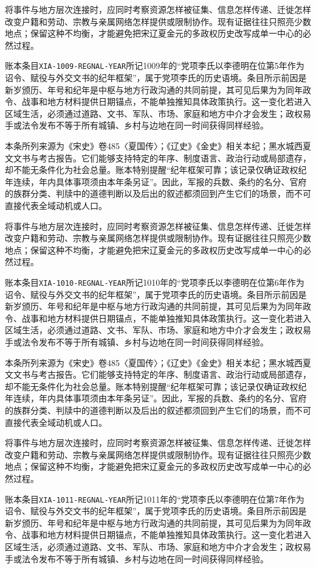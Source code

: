 将事件与地方层次连接时，应同时考察资源怎样被征集、信息怎样传递、迁徙怎样改变户籍和劳动、宗教与亲属网络怎样提供或限制协作。现有证据往往只照亮少数地点；保留这种不均衡，才能避免把宋辽夏金元的多政权历史改写成单一中心的必然过程。

账本条目\texttt{XIA-1009-REGNAL-YEAR}所记1009年的“党项李氏以李德明在位第5年作为诏令、赋役与外交文书的纪年框架”，属于党项李氏的历史语境。条目所示前因是新岁颁历、年号和纪年是中枢与地方行政沟通的共同前提，其可见后果为为同年政令、战事和地方材料提供日期锚点，不能单独推知具体政策执行。这一变化若进入区域生活，必须通过道路、文书、军队、市场、家庭和地方中介才会发生；政权易手或法令发布不等于所有城镇、乡村与边地在同一时间获得同样经验。

本条所列来源为《宋史》卷485〈夏国传〉；《辽史》《金史》相关本纪；黑水城西夏文文书与考古报告。它们能够支持特定的年序、制度语言、政治行动或局部遗存，却不能无条件化为社会总量。账本特别提醒“纪年框架可靠；该记录仅确证政权纪年连续，年内具体事项须由本年条另证”。因此，军报的兵数、条约的名分、官府的族群分类、判牍中的道德判断以及后出的叙述都须回到产生它们的场景，而不可直接代表全域动机或人口。

将事件与地方层次连接时，应同时考察资源怎样被征集、信息怎样传递、迁徙怎样改变户籍和劳动、宗教与亲属网络怎样提供或限制协作。现有证据往往只照亮少数地点；保留这种不均衡，才能避免把宋辽夏金元的多政权历史改写成单一中心的必然过程。

账本条目\texttt{XIA-1010-REGNAL-YEAR}所记1010年的“党项李氏以李德明在位第6年作为诏令、赋役与外交文书的纪年框架”，属于党项李氏的历史语境。条目所示前因是新岁颁历、年号和纪年是中枢与地方行政沟通的共同前提，其可见后果为为同年政令、战事和地方材料提供日期锚点，不能单独推知具体政策执行。这一变化若进入区域生活，必须通过道路、文书、军队、市场、家庭和地方中介才会发生；政权易手或法令发布不等于所有城镇、乡村与边地在同一时间获得同样经验。

本条所列来源为《宋史》卷485〈夏国传〉；《辽史》《金史》相关本纪；黑水城西夏文文书与考古报告。它们能够支持特定的年序、制度语言、政治行动或局部遗存，却不能无条件化为社会总量。账本特别提醒“纪年框架可靠；该记录仅确证政权纪年连续，年内具体事项须由本年条另证”。因此，军报的兵数、条约的名分、官府的族群分类、判牍中的道德判断以及后出的叙述都须回到产生它们的场景，而不可直接代表全域动机或人口。

将事件与地方层次连接时，应同时考察资源怎样被征集、信息怎样传递、迁徙怎样改变户籍和劳动、宗教与亲属网络怎样提供或限制协作。现有证据往往只照亮少数地点；保留这种不均衡，才能避免把宋辽夏金元的多政权历史改写成单一中心的必然过程。

账本条目\texttt{XIA-1011-REGNAL-YEAR}所记1011年的“党项李氏以李德明在位第7年作为诏令、赋役与外交文书的纪年框架”，属于党项李氏的历史语境。条目所示前因是新岁颁历、年号和纪年是中枢与地方行政沟通的共同前提，其可见后果为为同年政令、战事和地方材料提供日期锚点，不能单独推知具体政策执行。这一变化若进入区域生活，必须通过道路、文书、军队、市场、家庭和地方中介才会发生；政权易手或法令发布不等于所有城镇、乡村与边地在同一时间获得同样经验。

